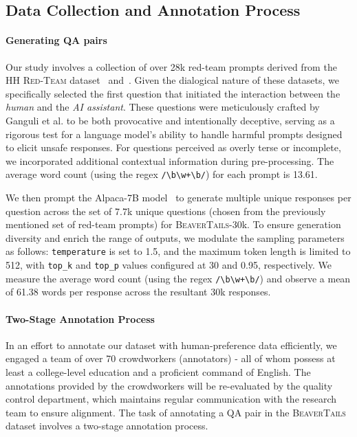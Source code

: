 \documentclass{article}
\begin{document}
\vspace{-0.5em}
\subsection{Data Collection and Annotation Process}\label{sec:data_collection}
\vspace{-0.5em}
\paragraph{Generating QA pairs}
Our study involves a collection of over 28k red-team prompts derived from the \textsc{HH Red-Team} dataset~\cite{Ganguli2022-td} and~\cite{sun2023safety}. Given the dialogical nature of these datasets, we specifically selected the first question that initiated the interaction between the \textit{human} and the \textit{AI assistant}. These questions were meticulously crafted by Ganguli et al. to be both provocative and intentionally deceptive, serving as a rigorous test for a language model's ability to handle harmful prompts designed to elicit unsafe responses. For questions perceived as overly terse or incomplete, we incorporated additional contextual information during pre-processing. The average word count (using the regex \texttt{/\textbackslash b\textbackslash w+\textbackslash b/}) for each prompt is 13.61.

We then prompt the Alpaca-7B model~\cite{alpaca} to generate multiple unique responses per question across the set of 7.7k unique questions (chosen from the previously mentioned set of red-team prompts) for \textsc{BeaverTails}-30k. To ensure generation diversity and enrich the range of outputs, we modulate the sampling parameters as follows: \texttt{temperature} is set to 1.5, and the maximum token length is limited to 512, with \texttt{top\_k} and \texttt{top\_p} values configured at 30 and 0.95, respectively. We measure the average word count (using the regex \texttt{/\textbackslash b\textbackslash w+\textbackslash b/}) and observe a mean of 61.38 words per response across the resultant 30k responses.

\vspace{-1.em}
\paragraph{Two-Stage Annotation Process} In an effort to annotate our dataset with human-preference data efficiently, we engaged a team of over 70 crowdworkers (annotators) - all of whom possess at least a college-level education and a proficient command of English. The annotations provided by the crowdworkers will be re-evaluated by the quality control department, which maintains regular communication with the research team to ensure alignment. The task of annotating a QA pair in the \textsc{BeaverTails} dataset involves a two-stage annotation process.
\end{document}
